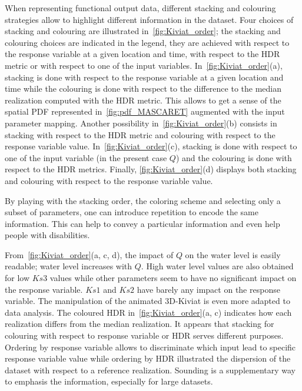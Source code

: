 When representing functional output data, different stacking and colouring strategies allow to highlight different information in the dataset. Four choices of stacking and colouring are illustrated in~\cref{fig:Kiviat_order}; the stacking and colouring choices are indicated in the legend, they are achieved with respect to the response variable at a given location and time, with respect to the HDR metric or with respect to one of the input variables. In~\cref{fig:Kiviat_order}(a), stacking is done with respect to the response variable at a given location and time while the colouring is done with respect to the difference to the median realization computed with the HDR metric. This allows to get a sense of the spatial PDF represented in~\cref{fig:pdf_MASCARET} augmented with the input parameter mapping. Another possibility in~\cref{fig:Kiviat_order}(b) consists in stacking with respect to the HDR metric and colouring with respect to the response variable value. In~\cref{fig:Kiviat_order}(c), stacking is done with respect to one of the input variable (in the present case $Q$) and the colouring is done with respect to the HDR metrics. Finally, \cref{fig:Kiviat_order}(d) displays both stacking and colouring with respect to the response variable value. %

By playing with the stacking order, the coloring scheme and selecting only a subset of parameters, one can introduce repetition to encode the same information. This can help to convey a particular information and even help people with disabilities.

From~\cref{fig:Kiviat_order}(a, c, d), the impact of $Q$ on the water level is easily readable; water level increases with $Q$. High water level values are also obtained for low $Ks3$ values while other parameters seem to have no significant impact on the response variable. $Ks1$ and $Ks2$ have barely any impact on the response variable. The manipulation of the animated 3D-Kiviat is even more adapted to data analysis. The coloured HDR in~\cref{fig:Kiviat_order}(a, c) indicates how each realization differs from the median realization. It appears that stacking for colouring with respect to response variable or HDR serves different purposes. Ordering by response variable allows to discriminate which input lead to specific response variable value while ordering by HDR illustrated the dispersion of the dataset with respect to a reference realization. Sounding is a supplementary way to emphasis the information, especially for large datasets.

